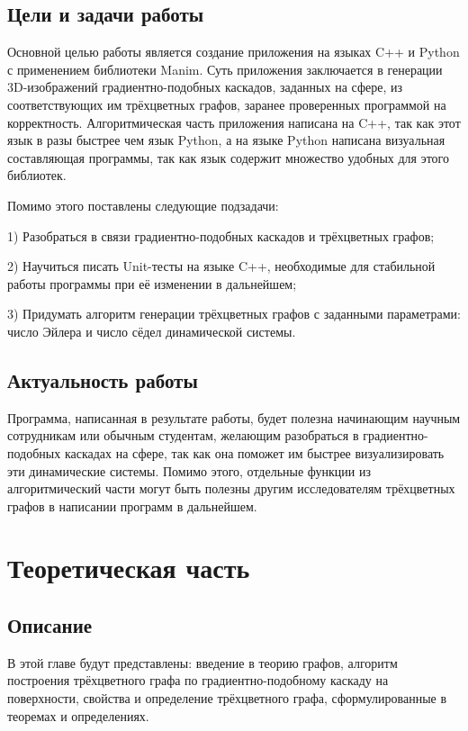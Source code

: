	\subsection{Цели и задачи работы}
		\hspace{0.5 cm} Основной целью работы является создание приложения на языках C++ и Python с применением библиотеки Manim. Суть приложения заключается в генерации 3D-изображений градиентно-подобных каскадов, заданных на сфере, из соответствующих им трёхцветных графов, заранее проверенных программой на корректность. Алгоритмическая часть приложения написана на C++, так как этот язык в разы быстрее чем язык Python, а на языке Python написана визуальная составляющая программы, так как язык содержит множество удобных для этого библиотек.
		\par Помимо этого поставлены следующие подзадачи:
		\par 1) Разобраться в связи градиентно-подобных каскадов и трёхцветных графов;
		\par 2) Научиться писать Unit-тесты на языке C++, необходимые для стабильной работы программы при её изменении в дальнейшем;
		\par 3) Придумать алгоритм генерации трёхцветных графов с заданными параметрами: число Эйлера и число сёдел динамической системы.
	\subsection{Актуальность работы}
		\hspace{0.5 cm} Программа, написанная в результате работы, будет полезна начинающим научным сотрудникам или обычным студентам, желающим разобраться в градиентно-подобных каскадах на сфере, так как она поможет им быстрее визуализировать эти динамические системы. Помимо этого, отдельные функции из алгоритмический части могут быть полезны другим исследователям трёхцветных графов в написании программ в дальнейшем.
	\newpage
	
	\section{Теоретическая часть}
	\subsection{Описание}
	\hspace{0.5 cm} В этой главе будут представлены: введение в теорию графов, алгоритм построения трёхцветного графа по градиентно-подобному каскаду на поверхности, свойства и определение трёхцветного графа, сформулированные в теоремах и определениях.

